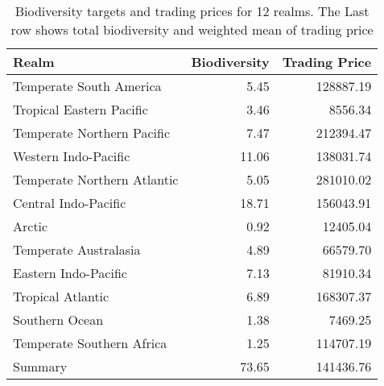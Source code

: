 \begin{table}

\caption{\label{tab:rlm-trading-prices}Biodiversity targets and trading prices for 12 realms. The Last row shows total biodiversity and weighted mean of trading price}
\centering
\begin{tabular}[t]{l|r|r}
\hline
Realm & Biodiversity & Trading Price\\
\hline
Temperate South America & 5.45 & 128887.19\\
\hline
Tropical Eastern Pacific & 3.46 & 8556.34\\
\hline
Temperate Northern Pacific & 7.47 & 212394.47\\
\hline
Western Indo-Pacific & 11.06 & 138031.74\\
\hline
Temperate Northern Atlantic & 5.05 & 281010.02\\
\hline
Central Indo-Pacific & 18.71 & 156043.91\\
\hline
Arctic & 0.92 & 12405.04\\
\hline
Temperate Australasia & 4.89 & 66579.70\\
\hline
Eastern Indo-Pacific & 7.13 & 81910.34\\
\hline
Tropical Atlantic & 6.89 & 168307.37\\
\hline
Southern Ocean & 1.38 & 7469.25\\
\hline
Temperate Southern Africa & 1.25 & 114707.19\\
\hline
Summary & 73.65 & 141436.76\\
\hline
\end{tabular}
\end{table}